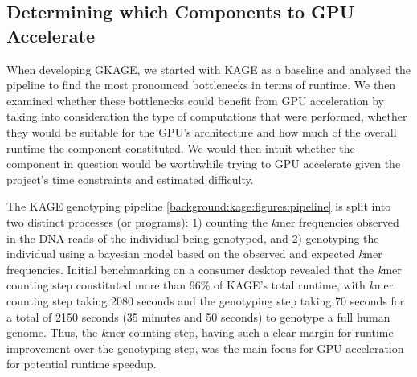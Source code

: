 \subsection{Determining which Components to GPU Accelerate} \label{methods:determining_which_components_to_gpu_accelerate}

When developing GKAGE, we started with KAGE as a baseline and analysed the pipeline to find the most pronounced bottlenecks in terms of runtime.
We then examined whether these bottlenecks could benefit from GPU acceleration by taking into consideration the type of computations that were performed, whether they would be suitable for the GPU's architecture and how much of the overall runtime the component constituted. 
We would then intuit whether the component in question would be worthwhile trying to GPU accelerate given the project's time constraints and estimated difficulty.

The KAGE genotyping pipeline \ref{background:kage:figures:pipeline} is split into two distinct processes (or programs): 1) counting the \textit{k}mer frequencies observed in the DNA reads of the individual being genotyped, and 2) genotyping the individual using a bayesian model based on the observed and expected \textit{k}mer frequencies.
Initial benchmarking on a consumer desktop revealed that the \textit{k}mer counting step constituted more than 96\% of KAGE's total runtime, with \textit{k}mer counting step taking 2080 seconds and the genotyping step taking 70 seconds for a total of 2150 seconds (35 minutes and 50 seconds) to genotype a full human genome.
Thus, the \textit{k}mer counting step, having such a clear margin for runtime improvement over the genotyping step, was the main focus for GPU acceleration for potential runtime speedup.
